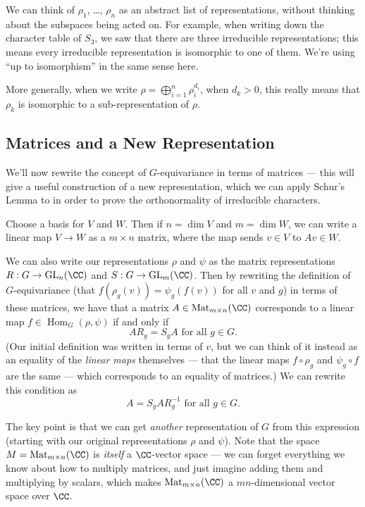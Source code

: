 \begin{ans}
We can think of $\rho_1$, \ldots, $\rho_n$ as an abstract list of representations, without thinking about the subspaces being acted on. For example, when writing down the character table of $S_3$, we saw that there are three irreducible representations; this means every irreducible representation is isomorphic to one of them. We're using ``up to isomorphism'' in the same sense here. 

More generally, when we write $\rho = \bigoplus_{i = 1}^n \rho_i^{d_i}$, when $d_k > 0$, this really means that $\rho_k$ is isomorphic to a sub-representation of $\rho$. 
\end{ans}

\subsection{Matrices and a New Representation}

We'll now rewrite the concept of $G$-equivariance in terms of matrices --- this will give a useful construction of a new representation, which we can apply Schur's Lemma to in order to prove the orthonormality of irreducible characters. 

Choose a basis for $V$ and $W$. Then if $n = \dim V$ and $m = \dim W$, we can write a linear map $V \to W$ as a $m \times n$ matrix, where the map sends $v \in V$ to $Av \in W$. 

We can also write our representations $\rho$ and $\psi$ as the matrix representations $R : G \to \operatorname{GL}_n(\CC)$ and $S : G \to \operatorname{GL}_m(\CC)$. Then by rewriting the definition of $G$-equivariance (that $f(\rho_g(v)) = \psi_g(f(v))$ for all $v$ and $g$) in terms of these matrices, we have that a matrix $A \in \operatorname{Mat}_{m\times n}(\CC)$ corresponds to a linear map $f \in \operatorname{Hom}_G(\rho, \psi)$ if and only if \[AR_g = S_gA \text{ for all } g \in G.\] (Our initial definition was written in terms of $v$, but we can think of it instead as an equality of the \emph{linear maps} themselves --- that the linear maps $f \circ \rho_g$ and $\psi_g \circ f$ are the same --- which corresponds to an equality of matrices.) We can rewrite this condition as \[A = S_gAR_g^{-1} \text{ for all } g \in G.\] 

The key point is that we can get \emph{another} representation of $G$ from this expression (starting with our original representations $\rho$ and $\psi$). Note that the space $M = \operatorname{Mat}_{m \times n}(\CC)$ is \emph{itself} a $\CC$-vector space --- we can forget everything we know about how to multiply matrices, and just imagine adding them and multiplying by scalars, which makes $\operatorname{Mat}_{m \times n}(\CC)$ a $mn$-dimensional vector space over $\CC$. 

